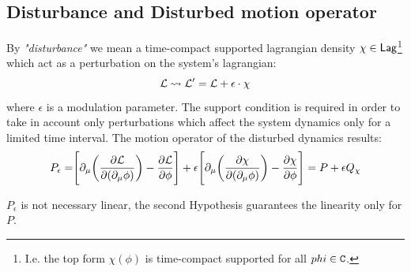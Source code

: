 \documentclass[Main]{subfiles}
\begin{document}
	\subsection{Disturbance and Disturbed motion operator }
		By \emph{"disturbance"} we mean a time-compact supported lagrangian density $\chi \in \mathsf{Lag}$\footnote{I.e. the top form $\chi(\phi)$ is time-compact supported for all $phi \in \mathtt{C}$.} which act as a perturbation on the system's lagrangian:
		\begin{displaymath}
			\mathcal{L} \rightsquigarrow \mathcal{L}' = \mathcal{L} + \epsilon\cdot \chi
		\end{displaymath}
		where $\epsilon$  is a modulation parameter.
		The support condition is required in order to take in account only perturbations which affect the system dynamics only for a limited time interval.
		The motion operator of the disturbed dynamics results:
		\begin{equation}
			P_\epsilon = \Biggr[ \partial_\mu \biggr( \frac{\partial \mathcal{L}}{\partial(\partial_\mu \phi)} \biggr) - \frac{\partial \mathcal{L}}{\partial \phi} \Biggr] + \epsilon \Biggr[ \partial_\mu \biggr( \frac{\partial \chi}{\partial(\partial_\mu \phi)} \biggr) - \frac{\partial \chi}{\partial \phi} \Biggr]
			= P + \epsilon Q_\chi		
		\end{equation}
		\begin{observation}
			$P_\epsilon$ is not necessary linear, the second Hypothesis guarantees the linearity only for $P$.
		\end{observation}
\end{document}
